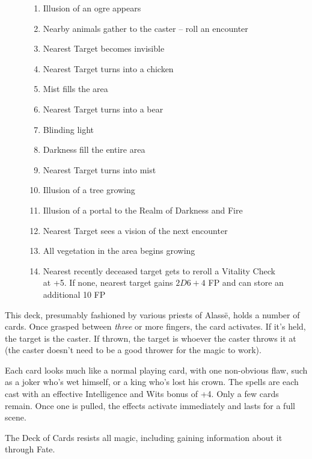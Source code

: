 \begin{multicols}{2}
\begin{figure*}[t!]
\begin{boxtext}
  \begin{multicols}{2}
  \begin{enumerate}
    \item{Illusion of an ogre appears}
    \item{Nearby animals gather to the caster -- roll an encounter}
    \item{Nearest Target becomes invisible}
    \item{Nearest Target turns into a chicken}
    \item{Mist fills the area}
    \item{Nearest Target turns into a bear}
    \item{Blinding light}
    \item{Darkness fill the entire area}
    \item{Nearest Target turns into mist}
    \item{Illusion of a tree growing}
    \item{Illusion of a portal to the Realm of Darkness and Fire}
    \item{Nearest Target sees a vision of the next encounter}
    \item{All vegetation in the area begins growing}
    \item{Nearest recently deceased target gets to reroll a Vitality Check at +5.  If none, nearest target gains $2D6+4$ FP and can store an additional 10 FP}
  \end{enumerate}
  \end{multicols}
\end{boxtext}
\end{figure*}

This deck, presumably fashioned by various priests of Alass\"{e}, holds a number of cards.
Once grasped between \emph{three} or more fingers, the card activates.
If it's held, the target is the caster.
If thrown, the target is whoever the caster throws it at (the caster doesn't need to be a good thrower for the magic to work).

Each card looks much like a normal playing card, with one non-obvious flaw, such as a joker who's wet himself, or a king who's lost his crown.  The spells are each cast with an effective Intelligence and Wits bonus of +4.  Only a few cards remain.  Once one is pulled, the effects activate immediately and lasts for a full scene.

The Deck of Cards resists all magic, including gaining information about it through Fate.


\end{multicols}
